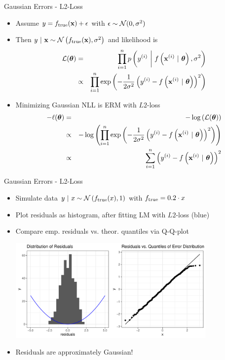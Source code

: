 \documentclass[11pt,compress,t,notes=noshow, xcolor=table]{beamer}
\begin{document}
\begin{vbframe}{Gaussian Errors - L2-Loss} 

\begin{itemize}

\item Assume $y = f_{\text{true}}(\mathbf{x}) + \epsilon$ with $\epsilon \sim \mathcal{N}(0, \sigma^2)$ 
\item Then $y~|~\mathbf{x} \sim \mathcal{N}\left(f_{\text{true}}(\mathbf{x}), \sigma^2\right)$ and likelihood is 
{\small
\begin{eqnarray*}
\mathcal{L}(\bm{\theta}) &=& \prod\limits_{i=1}^n p\left(y^{(i)} ~\bigg|~ f\left(\mathbf{x}^{(i)} ~|~ \bm{\theta}\right), \sigma^2\right) \\ &\propto& \prod\limits_{i=1}^n \exp\left(-\frac{1}{2\sigma^2} \left(y^{(i)} - f\left(\mathbf{x}^{(i)} ~|~ \bm{\theta}\right)\right)^2\right)
\end{eqnarray*}
}


\item Minimizing Gaussian NLL is ERM with $L2$-loss
{\small
\begin{eqnarray*}
- \ell(\bm{\theta}) &=& - \log\left(\mathcal{L}(\bm{\theta})\right) \\
&\propto& - \log\left(\prod\limits_{i=1}^n \exp\left(-\frac{1}{2\sigma^2} \left(y^{(i)} - f\left(\mathbf{x}^{(i)} ~|~ \bm{\theta}\right)\right)^2\right)\right) \\
&\propto& \sum\limits_{i=1}^n \left(y^{(i)} - f\left(\mathbf{x}^{(i)} ~|~ \bm{\theta}\right)\right)^2
\end{eqnarray*}
}

\end{itemize}
\end{vbframe}
\begin{vbframe}{Gaussian Errors - L2-Loss} 

\begin{itemize}
	\item Simulate data $y ~|~x \sim \mathcal{N}\left(f_{\text{true}}(x), 1\right)$ with $f_{\text{true}} = 0.2 \cdot x$ 
\item Plot residuals as histogram, after fitting LM with $L2$-loss (blue)
\item Compare emp. residuals vs. theor. quantiles via Q-Q-plot

\begin{center}
\includegraphics[width = 0.8\textwidth]{figure/residuals_plot_L2.pdf}
\end{center}

\item Residuals are approximately Gaussian!
\end{itemize}

\end{vbframe}
\end{document}
